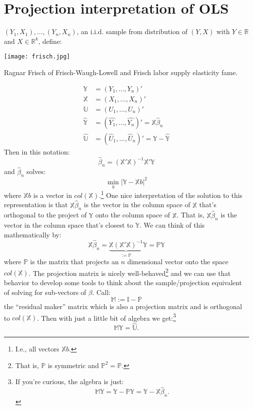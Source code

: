 \documentclass{tufte-book}
\theoremstyle{mytheoremstyle}
\theoremstyle{mylemstyle}
\theoremstyle{mydefstyle}
\begin{document}
\section{Projection interpretation of OLS}
 \((Y_1, X_1), \dots, (Y_n, X_n)\), an i.i.d. sample from distribution of \((Y, X)\) with \(Y \in \mathbb{R}\) and \(X \in \mathbb{R}^k\), define:\begin{marginfigure} \texttt{[image: frisch.jpg]} \caption{Ragnar Frisch of Frisch-Waugh-Lowell and Frisch labor supply elasticity fame.} \end{marginfigure}
	\begin{align*}
		\mathbb{Y} &= (Y_1, \dots, Y_n)' \\
		\mathbb{X} &= (X_1, \dots, X_n)' \\
		\mathbb{U} &= (U_1, \dots, U_n)' \\
		\hat{\mathbb{Y}} &= (\hat{Y_1}, \dots, \hat{Y_n})' = \mathbb{X}\hat{\beta}_n \\
		\hat{\mathbb{U}} & = (\hat{U}_1, \dots, \hat{U}_n)' = \mathbb{Y} - \hat{\mathbb{Y}}
	\end{align*}
Then in this notation:
	\[\hat{\beta}_n = (\mathbb{X}'\mathbb{X})^{-1}\mathbb{X}' \mathbb{Y}\]
and \(\hat{\beta}_n\) solves:
	\[\min_b |\mathbb{Y} - \mathbb{X}b|^2\]
where \(\mathbb{X}b\) is a vector in \(col(\mathbb{X})\).\footnote{I.e., all vectors \(\mathbb{X}b\).} One nice interpretation of the solution to this representation is that \(\mathbb{X}\hat{\beta}_n\) is the vector in the column space of \(\mathbb{X}\) that's orthogonal to the project of \(\mathbb{Y}\) onto the column space of \(\mathbb{X}\). That is, \(\mathbb{X}\hat{\beta}_n\) is the vector in the column space that's closest to \(\mathbb{Y}\). We can think of this mathematically by:
	\[\mathbb{X}\hat{\beta}_n = \underbrace{\mathbb{X}(\mathbb{X}'\mathbb{X})^{-1}}_\mathrm{:=\mathbb{P}}\mathbb{Y} = \mathbb{P}\mathbb{Y}\]
where \(\mathbb{P}\) is the matrix that projects an \(n\) dimensional vector onto the space \(col(\mathbb{X})\). The projection matrix is nicely well-behaved\footnote{That is, \(\mathbb{P}\) is symmetric and \(\mathbb{P}^2 = \mathbb{P}\).} and we can use that behavior to develop some tools to think about the sample/projection equivalent of solving for sub-vectors of \(\beta\). Call:
	\[\mathbb{M} := \mathbb{I} - \mathbb{P}\]
the ``residual maker'' matrix which is also a projection matrix and is orthogonal to \(col(\mathbb{X})\). Then with just a little bit of algebra we get:\footnote{If you're curious, the algebra is just: \[\mathbb{M}\mathbb{Y} = \mathbb{Y} - \mathbb{P}\mathbb{Y} = \mathbb{Y} - \mathbb{X}\hat{\beta}_n \text{.}\]}
	\[\mathbb{M}\mathbb{Y} = \hat{\mathbb{U}} \text{.}\]
\end{document}
